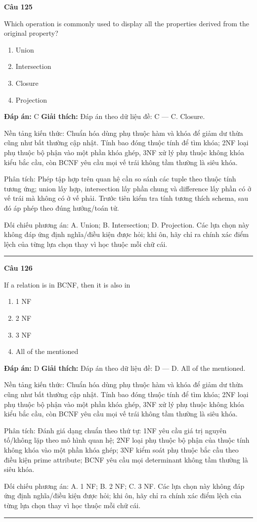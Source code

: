\documentclass[11pt,a4paper]{article}
\newenvironment{question}[1]{%
  \par\vspace{1em}\noindent\textbf{\large Câu #1}\par\vspace{0.4em}
}{%
  \par\vspace{1em}\hrule\vspace{0.6em}
}
\newenvironment{choices}{%
  \begin{enumerate}[label=\textbf{\Alph*.},leftmargin=2.2em,itemsep=2pt,topsep=3pt]
}{%
  \end{enumerate}
}
\newcommand{\choice}{\item}
\begin{document}
\begin{question}{125}
Which operation is commonly used to display all the properties derived from the original property?
\begin{choices}
\choice Union
\choice Intersection
\choice Closure
\choice Projection
\end{choices}
\textbf{Đáp án:} C
\textbf{Giải thích:} Đáp án theo dữ liệu đề: C — C. Closure.

Nền tảng kiến thức: Chuẩn hóa dùng phụ thuộc hàm và khóa để giảm dư thừa cũng như bất thường cập nhật. Tính bao đóng thuộc tính để tìm khóa; 2NF loại phụ thuộc bộ phận vào một phần khóa ghép, 3NF xử lý phụ thuộc không khóa kiểu bắc cầu, còn BCNF yêu cầu mọi vế trái không tầm thường là siêu khóa.

Phân tích: Phép tập hợp trên quan hệ cần so sánh các tuple theo thuộc tính tương ứng; union lấy hợp, intersection lấy phần chung và difference lấy phần có ở vế trái mà không có ở vế phải. Trước tiên kiểm tra tính tương thích schema, sau đó áp phép theo đúng hướng/toán tử.

Đối chiếu phương án: A. Union; B. Intersection; D. Projection. Các lựa chọn này không đáp ứng định nghĩa/điều kiện được hỏi; khi ôn, hãy chỉ ra chính xác điểm lệch của từng lựa chọn thay vì học thuộc mỗi chữ cái.
\end{question}

\begin{question}{126}
If a relation is in BCNF, then it is also in
\begin{choices}
\choice 1 NF
\choice 2 NF
\choice 3 NF
\choice All of the mentioned
\end{choices}
\textbf{Đáp án:} D
\textbf{Giải thích:} Đáp án theo dữ liệu đề: D — D. All of the mentioned.

Nền tảng kiến thức: Chuẩn hóa dùng phụ thuộc hàm và khóa để giảm dư thừa cũng như bất thường cập nhật. Tính bao đóng thuộc tính để tìm khóa; 2NF loại phụ thuộc bộ phận vào một phần khóa ghép, 3NF xử lý phụ thuộc không khóa kiểu bắc cầu, còn BCNF yêu cầu mọi vế trái không tầm thường là siêu khóa.

Phân tích: Đánh giá dạng chuẩn theo thứ tự: 1NF yêu cầu giá trị nguyên tố/không lặp theo mô hình quan hệ; 2NF loại phụ thuộc bộ phận của thuộc tính không khóa vào một phần khóa ghép; 3NF kiểm soát phụ thuộc bắc cầu theo điều kiện prime attribute; BCNF yêu cầu mọi determinant không tầm thường là siêu khóa.

Đối chiếu phương án: A. 1 NF; B. 2 NF; C. 3 NF. Các lựa chọn này không đáp ứng định nghĩa/điều kiện được hỏi; khi ôn, hãy chỉ ra chính xác điểm lệch của từng lựa chọn thay vì học thuộc mỗi chữ cái.
\end{question}
\end{document}
